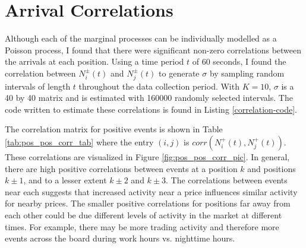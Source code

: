 \section{Arrival Correlations}\label{ch:correlations}
Although each of the marginal processes can be individually modelled as a Poisson process, I found that there were significant non-zero correlations between the arrivals at each position. Using a time period $t$ of 60 seconds, I found the correlation between $N^{\pm}_i(t)$ and $N^{\pm}_j(t)$ to generate $\sigma$ by sampling random intervals of length $t$ throughout the data collection period. With $K=10$, $\sigma$ is a 40 by 40 matrix and is estimated with 160000 randomly selected intervals. The code written to estimate these correlations is found in Listing \ref{correlation-code}.

The correlation matrix for positive events is shown in Table \ref{tab:pos_pos_corr_tab} where the entry $(i,j)$ is $corr(N^{+}_i(t), N^{+}_j(t))$. These correlations are visualized in Figure \ref{fig:pos_pos_corr_pic}. In general, there are high positive correlations between events at a position $k$ and positions $k \pm 1$, and to a lesser extent $k \pm 2$ and $k \pm 3$. The correlations between events near each suggests that increased activity near a price influences similar activity for nearby prices. The smaller positive correlations for positions far away from each other could be due different levels of activity in the market at different times. For example, there may be more trading activity and therefore more events across the board during work hours vs. nighttime hours.

